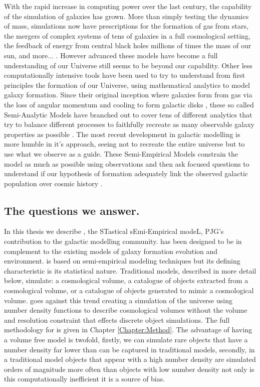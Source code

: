 With the rapid increase in computing power over the last century, the capability of the simulation of galaxies has grown. More than simply testing the dynamics of mass, simulations now have prescriptions for the formation of gas from stars, the mergers of complex systems of tens of galaxies in a full cosmological setting, the feedback of energy from central black holes millions of times the mass of our sun, and more... \citep[e.g.,][]{McAlpine2015TheCatalogues, Pillepich2018FirstGalaxies}. However advanced these models have become a full understanding of our Universe still seems to be beyond our capability. Other less computationally intensive tools have been used to try to understand from first principles the formation of our Universe, using mathematical analytics to model galaxy formation. Since their original inception where galaxies form from gas via the loss of angular momentum and cooling to form galactic disks \cite{Mo1998TheDiscs}, these so called Semi-Analytic Models have branched out to cover tens of different analytics that try to balance different processes to faithfully recreate as many observable galaxy properties as possible \citep[e.g.,][]{DeLucia2006TheGalaxies, Guo2011FromCosmology}. The most recent development in galactic modelling is more humble in it's approach, seeing not to recreate the entire universe but to use what we observe as a guide. These Semi-Empirical Models constrain the model as much as possible using observations and then ask focused questions to understand if our hypothesis of formation adequately link the observed galactic population over cosmic history \citep{Hopkins2010MERGERSMATTER, Zavala2012, Moster2013, Shankar2014, Moster2018Emerge10}.

\subsection{The questions we answer.}
In this thesis we describe \steel, the STastical sEmi-Empirical modeL, PJG's contribution to the galactic modelling community. \steel has been designed to be in complement to the existing models of galaxy formation evolution and environment. \steel is based on semi-empirical modeling techniques but its defining characteristic is its statistical nature. Traditional models, described in more detail below, simulate: a cosmological volume, a catalogue of objects extracted from a cosmological volume, or a catalogue of objects generated to mimic a cosmological volume. \steel goes against this trend creating a simulation of the universe using number density functions to describe cosmological volumes without the volume and resolution constraint that effects discrete object simulations. The full methodology for \steel is given in Chapter \ref{Chapter:Method}. The advantage of having a volume free model is twofold, firstly, we can simulate rare objects that have a number density far lower than can be captured in traditional models, secondly, in a traditional model objects that appear with a high number density are simulated orders of magnitude more often than objects with low number density not only is this computationally inefficient it is a source of bias. 

